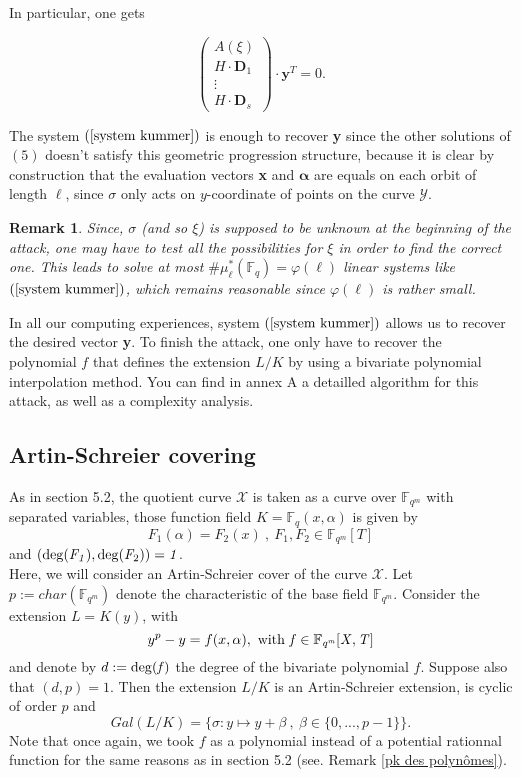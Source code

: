 \documentclass[10pt]{article}
\newtheorem{rq1}[thm]{Remark}
\newcommand{\s}{\vspace{0.3cm}}
\newcommand{\cd}{\cdot}
\newcommand{\fqm}{\mathbb{F}_{q^m}}
\newcommand{\fq}{\mathbb{F}_q}
\newcommand{\X}{\mathcal{X}}
\newcommand{\Y}{\mathcal{Y}}
\begin{document}
In particular, one gets


\begin{equation} \label{system kummer}
\begin{pmatrix}
A(\xi) \\
H \cd \textbf{D}_1 \\
\vdots \\
H \cd \textbf{D}_s
\end{pmatrix}
\cd \textbf{y}^T = 0.
\end{equation}

The system $(\ref{system kummer})$ is enough to recover \textbf{y} since the other solutions of $(5)$ doesn't satisfy this geometric progression structure, because it is clear by construction that the evaluation vectors \textbf{x} and $\boldsymbol{\alpha}$ are equals on each orbit of length $\ell$, since $\sigma$ only acts on $y$-coordinate of points on the curve $\Y$. 

\s

\begin{rq1} \rm
Since, $\sigma$ (and so $\xi$) is supposed to be unknown at the beginning of the attack, one may have to test all the possibilities for $\xi$ in order to find the correct one. This leads to solve at most $\#\mu^*_{\ell}(\fq) = \varphi(\ell)$ linear systems like $(\ref{system kummer})$, which remains reasonable since $\varphi(\ell)$ is rather small.
\end{rq1}

\s

In all our computing experiences, system $(\ref{system kummer})$ allows us to recover the desired vector \textbf{y}. To finish the attack, one only have to recover the polynomial $f$ that defines the extension $L/K$ by using a bivariate polynomial interpolation method. You can find in annex A a detailled algorithm for this attack, as well as a complexity analysis.

\s


\subsection{Artin-Schreier covering}

\s

As in section 5.2, the quotient curve $\X$ is taken as a curve over $\fqm$ with separated variables, those function field $K = \fq(x,\alpha)$ is given by 
\[F_1(\alpha) = F_2(x) \ , \ F_1,F_2 \in \fqm[T]\]
and $(\rm{deg}\it(F_1),\rm{deg}\it(F_{\rm 2}))=1$. \\ 
Here, we will consider an Artin-Schreier cover of the curve $\X$.
Let $p:=char(\fqm)$ denote the characteristic of the base field $\fqm$. Consider the extension $L=K(y)$, with
\[y^p-y = f(x,\alpha) , \ \rm with \it \ f \in \fqm[X,T]\]
and denote by $d:=\rm{deg}\it(f)$ the degree of the bivariate polynomial $f$. Suppose also that $(d,p)=1$. Then the extension $L/K$ is an Artin-Schreier extension, is cyclic of order $p$ and 
\[Gal(L/K) = \{ \sigma : y \mapsto y + \beta \ , \ \beta \in \{0,...,p-1\}\}.\]
Note that once again, we took $f$ as a polynomial instead of a potential rationnal function for the same reasons as in section 5.2 (see. Remark \ref{pk des polynômes}).
\end{document}
